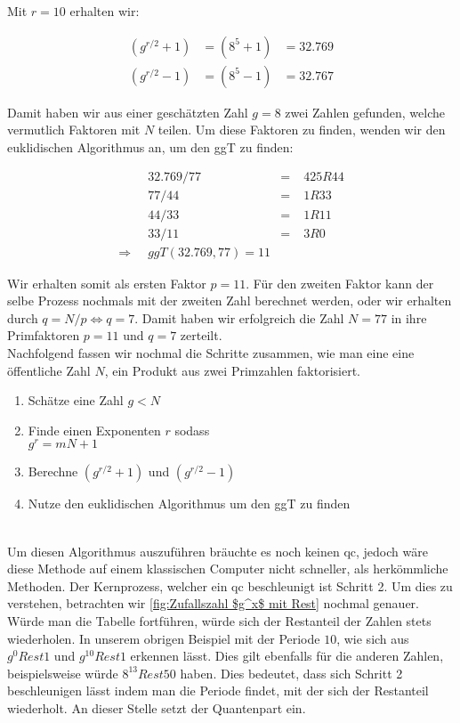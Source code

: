 Mit $r = 10$ erhalten wir:

\begin{align*}
    (g^{r/2} + 1) &= (8^5 + 1) &= 32.769 \\
    (g^{r/2} - 1) &= (8^5 - 1) &= 32.767
\end{align*}

Damit haben wir aus einer geschätzten Zahl $g = 8$ zwei Zahlen gefunden, welche vermutlich Faktoren mit $N$ teilen. 
Um diese Faktoren zu finden, wenden wir den euklidischen Algorithmus an, um den \ac*{ggT} zu finden:

\begin{align*}
    & 32.769 / 77 &=\;&  425 R 44    \\
    & 77 / 44     &=\;&  1 R 33      \\
    & 44 / 33     &=\;&  1 R 11      \\
    & 33 / 11     &=\;&  3 R 0       \\
    \Rightarrow\;\; & ggT(32.769, 77) = 11
\end{align*}

Wir erhalten somit als ersten Faktor $p = 11$. 
Für den zweiten Faktor kann der selbe Prozess nochmals mit der zweiten Zahl berechnet werden, oder wir erhalten durch $q = N/p \Leftrightarrow q = 7$. 
Damit haben wir erfolgreich die Zahl $N = 77$ in ihre Primfaktoren $p=11$ und $q=7$ zerteilt.\\


Nachfolgend fassen wir nochmal die Schritte zusammen, wie man eine eine öffentliche Zahl $N$, ein Produkt aus zwei Primzahlen faktorisiert.

\begin{enumerate}
    \item Schätze eine Zahl $g < N$
    \item Finde einen Exponenten $r$ sodass\\$g^r = mN + 1$
    \item Berechne $(g^{r/2} + 1)$ und $(g^{r/2} - 1)$
    \item Nutze den euklidischen Algorithmus um den \ac{ggT} zu finden
\end{enumerate}
\\

Um diesen Algorithmus auszuführen bräuchte es noch keinen \ac{qc}, jedoch wäre diese Methode auf einem klassischen Computer nicht schneller, als herkömmliche Methoden. 
Der Kernprozess, welcher ein \ac{qc} beschleunigt ist Schritt 2. Um dies zu verstehen, betrachten wir \ref{fig:Zufallszahl $g^x$ mit Rest} nochmal genauer. 
Würde man die Tabelle fortführen, würde sich der Restanteil der Zahlen stets wiederholen. In unserem obrigen Beispiel mit der Periode $10$, 
wie sich aus $g^0 Rest 1$ und $g^{10} Rest 1$ erkennen lässt. Dies gilt ebenfalls für die anderen Zahlen, beispielsweise würde $8^{13} Rest 50$ haben.
Dies bedeutet, dass sich Schritt 2 beschleunigen lässt indem man die Periode findet, mit der sich der Restanteil wiederholt. 
An dieser Stelle setzt der Quantenpart ein.\\

